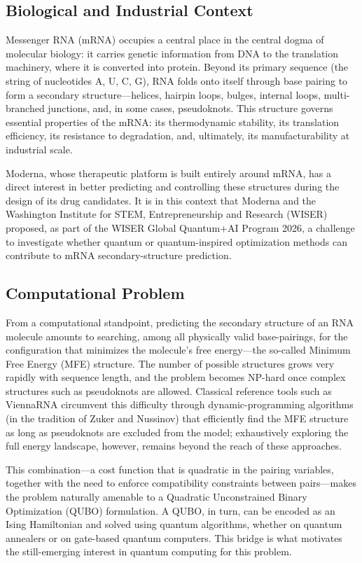 \documentclass[11pt,a4paper]{article}
\begin{document}
	\subsection{Biological and Industrial Context}
	
	Messenger RNA (mRNA) occupies a central place in the central dogma of molecular biology: it carries genetic information from DNA to the translation machinery, where it is converted into protein. Beyond its primary sequence (the string of nucleotides A, U, C, G), RNA folds onto itself through base pairing to form a secondary structure---helices, hairpin loops, bulges, internal loops, multi-branched junctions, and, in some cases, pseudoknots. This structure governs essential properties of the mRNA: its thermodynamic stability, its translation efficiency, its resistance to degradation, and, ultimately, its manufacturability at industrial scale.
	
	Moderna, whose therapeutic platform is built entirely around mRNA, has a direct interest in better predicting and controlling these structures during the design of its drug candidates. It is in this context that Moderna and the Washington Institute for STEM, Entrepreneurship and Research (WISER) proposed, as part of the WISER Global Quantum+AI Program 2026, a challenge to investigate whether quantum or quantum-inspired optimization methods can contribute to mRNA secondary-structure prediction.
	
	\subsection{Computational Problem}
	
	From a computational standpoint, predicting the secondary structure of an RNA molecule amounts to searching, among all physically valid base-pairings, for the configuration that minimizes the molecule's free energy---the so-called Minimum Free Energy (MFE) structure. The number of possible structures grows very rapidly with sequence length, and the problem becomes NP-hard once complex structures such as pseudoknots are allowed. Classical reference tools such as ViennaRNA circumvent this difficulty through dynamic-programming algorithms (in the tradition of Zuker and Nussinov) that efficiently find the MFE structure as long as pseudoknots are excluded from the model; exhaustively exploring the full energy landscape, however, remains beyond the reach of these approaches.
	
	This combination---a cost function that is quadratic in the pairing variables, together with the need to enforce compatibility constraints between pairs---makes the problem naturally amenable to a Quadratic Unconstrained Binary Optimization (QUBO) formulation. A QUBO, in turn, can be encoded as an Ising Hamiltonian and solved using quantum algorithms, whether on quantum annealers or on gate-based quantum computers. This bridge is what motivates the still-emerging interest in quantum computing for this problem.
	
\end{document}
